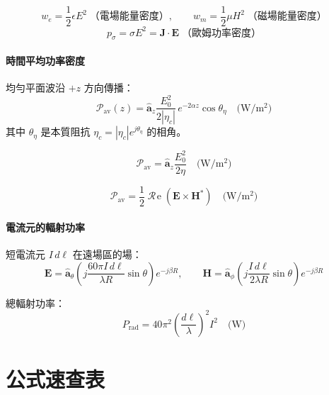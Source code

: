 \documentclass[12pt,a4paper]{article}
\newcommand{\vE}{\mathbf{E}}
\newcommand{\vH}{\mathbf{H}}
\newcommand{\vJ}{\mathbf{J}}
\newcommand{\az}{\hat{\mathbf{a}}_z}
\newcommand{\ath}{\hat{\mathbf{a}}_\theta}
\newcommand{\aph}{\hat{\mathbf{a}}_\phi}
\newcommand{\Rea}{\operatorname{\mathcal{R}\!e}}
\begin{document}
\begin{notebox}[能量密度]
\[
w_e = \frac{1}{2}\epsilon E^2 \;\text{（電場能量密度）}, \qquad
w_m = \frac{1}{2}\mu H^2 \;\text{（磁場能量密度）}
\]
\[
p_\sigma = \sigma E^2 = \vJ\cdot\vE \;\text{（歐姆功率密度）}
\]
\end{notebox}

\subsection{時間平均功率密度}

\begin{keybox}
均勻平面波沿 $+z$ 方向傳播：
\[
\boldsymbol{\mathcal{P}}_{\text{av}}(z) = \az\frac{E_0^2}{2|\eta_c|}\,e^{-2\alpha z}\cos\theta_\eta \quad\text{(W/m$^2$)}
\]
其中 $\theta_\eta$ 是本質阻抗 $\eta_c = |\eta_c|e^{j\theta_\eta}$ 的相角。
\end{keybox}

\begin{keybox}[無損介質（$\alpha=0$, $\theta_\eta=0$）]
\[
\boldsymbol{\mathcal{P}}_{\text{av}} = \az\frac{E_0^2}{2\eta} \quad\text{(W/m$^2$)}
\]
\end{keybox}

\begin{keybox}
\[
\boxed{\boldsymbol{\mathcal{P}}_{\text{av}} = \frac{1}{2}\Rea(\vE\times\vH^*)} \quad\text{(W/m$^2$)}
\]
\end{keybox}

\subsection{電流元的輻射功率}

短電流元 $I\,d\ell$ 在遠場區的場：
\[
\vE = \ath\left(j\frac{60\pi I\,d\ell}{\lambda R}\sin\theta\right)e^{-j\beta R}, \qquad
\vH = \aph\left(j\frac{I\,d\ell}{2\lambda R}\sin\theta\right)e^{-j\beta R}
\]

總輻射功率：
\[
P_{\text{rad}} = 40\pi^2\left(\frac{d\ell}{\lambda}\right)^2 I^2 \quad\text{(W)}
\]

\newpage
\part{公式速查表}
\end{document}

